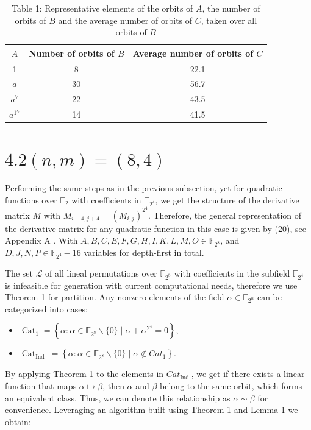 \documentclass[10pt]{article}
\begin{document}
\begin{table}[h]
\begin{center}
\begin{tabular}{c|c|c}
$A$ & Number of orbits of $B$ & Average number of orbits of $C$ \\
\hline
1 & 8 & 22.1 \\
$a$ & 30 & 56.7 \\
$a^{7}$ & 22 & 43.5 \\
$a^{17}$ & 14 & 41.5 \\
\end{tabular}
\captionsetup{labelformat=empty}
\caption{Table 1: Representative elements of the orbits of $A$, the number of orbits of $B$ and the average number of orbits of $C$, taken over all orbits of $B$}
\end{center}
\end{table}

\section*{$4.2(n, m)=(8,4)$}
Performing the same steps as in the previous subsection, yet for quadratic functions over $\mathbb{F}_{2}$ with coefficients in $\mathbb{F}_{2^{4}}$, we get the structure of the derivative matrix $M$ with $M_{i+4, j+4}=\left(M_{i, j}\right)^{2^{4}}$. Therefore, the general representation of the derivative matrix for any quadratic function in this case is given by (20), see Appendix A . With $A, B, C, E, F, G, H, I, K, L, M, O \in \mathbb{F}_{2^{8}}$, and $D, J, N, P \in \mathbb{F}_{2^{4}}-16$ variables for depth-first in total.

The set $\mathcal{L}$ of all lineal permutations over $\mathbb{F}_{2^{8}}$ with coefficients in the subfield $\mathbb{F}_{2^{4}}$ is infeasible for generation with current computational needs, therefore we use Theorem 1 for partition. Any nonzero elements of the field $\alpha \in \mathbb{F}_{2^{n}}$ can be categorized into cases:

\begin{itemize}
  \item $\operatorname{Cat}_{1}=\left\{\alpha: \alpha \in \mathbb{F}_{2^{8}} \backslash\{0\} \mid \alpha+\alpha^{2^{4}}=0\right\}$,
  \item $\operatorname{Cat}_{\text {Ind }}=\left\{\alpha: \alpha \in \mathbb{F}_{2^{8}} \backslash\{0\} \mid \alpha \notin C a t_{1}\right\}$.
\end{itemize}

By applying Theorem 1 to the elements in $C a t_{\text {Ind }}$, we get if there exists a linear function that maps $\alpha \mapsto \beta$, then $\alpha$ and $\beta$ belong to the same orbit, which forms an equivalent class. Thus, we can denote this relationship as $\alpha \sim \beta$ for convenience. Leveraging an algorithm built using Theorem 1 and Lemma 1 we obtain:
\end{document}
